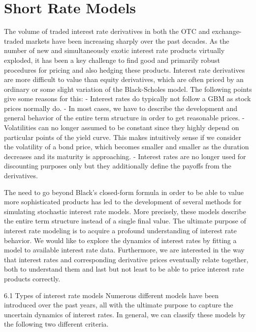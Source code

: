 \chapter{Short Rate Models}

The volume of traded interest rate derivatives in both the OTC and exchange-traded 
markets have been increasing sharply over the past decades. As the number of new 
and simultaneously exotic interest rate products virtually exploded, 
it has been a key challenge to find good and primarily robust procedures for 
pricing and also hedging these products. Interest rate derivatives are more 
difficult to value than equity derivatives, which are often priced by an ordinary 
or some slight variation of the Black-Scholes model. 
The following points give some reasons for this:
- Interest rates do typically not follow a GBM as stock prices normally do.
- In most cases, we have to describe the development and general behavior of the entire term structure in order to get reasonable prices.
- Volatilities can no longer assumed to be constant since they highly depend on particular points of the yield curve. This makes intuitively sense if we consider the volatility of a bond price, which becomes smaller and smaller as the duration decreases and its maturity is approaching.
- Interest rates are no longer used for discounting purposes only but they additionally define the payoffs from the derivatives.

The need to go beyond Black’s closed-form formula in order to be able to 
value more sophisticated products has led to the development of several 
methods for simulating stochastic
interest rate models. More precisely, these models describe the entire 
term structure instead of a single final value. The ultimate purpose of 
interest rate modeling is to acquire a profound understanding of interest 
rate behavior. We would like to explore the dynamics of interest rates by 
fitting a model to available interest rate data. Furthermore, we are 
interested in the way that interest rates and corresponding derivative 
prices eventually relate together, both to understand them and last 
but not least to be able to price interest rate products correctly.

6.1 Types of interest rate models
Numerous different models have been introduced over the past years, 
all with the ultimate purpose to capture the uncertain dynamics of 
interest rates. In general, we can classify these models by the 
following two different criteria.

